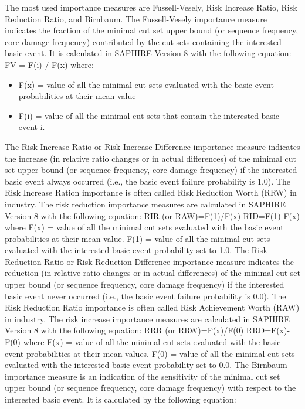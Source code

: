 The most used importance measures are Fussell-Vesely, Risk Increase Ratio, Risk Reduction Ratio, 
and Birnbaum. 
The Fussell-Vesely importance measure indicates the fraction of the minimal cut set upper bound 
(or sequence frequency, core damage frequency) contributed by the cut sets containing the 
interested basic event. It is calculated in SAPHIRE Version 8 with the following equation:
FV = F(i) / F(x)
where:
\begin{itemize}
  \item F(x) = value of all the minimal cut sets evaluated with the basic event probabilities at their mean value
  \item F(i) = value of all the minimal cut sets that contain the interested basic event i.
\end{itemize}

    
The Risk Increase Ratio or Risk Increase Difference importance measure indicates the increase (in relative ratio changes or in actual differences) of the minimal cut set upper bound (or sequence frequency, core damage frequency) if the interested basic event always occurred (i.e., the basic event failure probability is 1.0). The Risk Increase Ration importance is often called Risk Reduction Worth (RRW) in industry. The risk reduction importance measures are calculated in SAPHIRE Version 8 with the following equation:
RIR (or RAW)=F(1)/F(x)
RID=F(1)-F(x)
where F(x) = value of all the minimal cut sets evaluated with the basic event probabilities at their mean value.
   F(1) = value of all the minimal cut sets evaluated with the interested basic event probability set to 1.0.
The Risk Reduction Ratio or Risk Reduction Difference importance measure indicates the reduction (in relative ratio changes or in actual differences) of the minimal cut set upper bound (or sequence frequency, core damage frequency) if the interested basic event never occurred (i.e., the basic event failure probability is 0.0). The Risk Reduction Ratio importance is often called Risk Achievement Worth (RAW) in industry. The risk increase importance measures are calculated in SAPHIRE Version 8 with the following equation:
RRR (or RRW)=F(x)/F(0)
RRD=F(x)-F(0)
where F(x) = value of all the minimal cut sets evaluated with the basic event probabilities at their mean values.
    F(0) = value of all the minimal cut sets evaluated with the interested basic event probability set to 0.0.
The Birnbaum importance measure is an indication of the sensitivity of the minimal cut set upper bound (or sequence frequency, core damage frequency) with respect to the interested basic event. It is calculated by the following equation:
